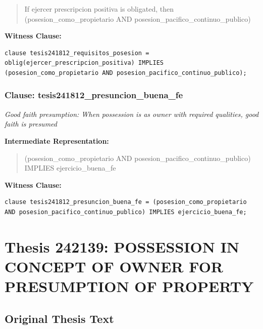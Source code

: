 \documentclass[11pt,a4paper]{article}
\begin{document}
\begin{quote}
If ejercer prescripcion positiva is obligated, then (posesion\_como\_propietario AND posesion\_pacifico\_continuo\_publico)
\end{quote}

\textbf{Witness Clause:}

\begin{lstlisting}[style=witnessstyle, language=Witness]
clause tesis241812_requisitos_posesion = oblig(ejercer_prescripcion_positiva) IMPLIES (posesion_como_propietario AND posesion_pacifico_continuo_publico);
\end{lstlisting}

\subsubsection{Clause: tesis241812\_presuncion\_buena\_fe}

\textit{Good faith presumption: When possession is as owner with required qualities, good faith is presumed}

\textbf{Intermediate Representation:}

\begin{quote}
(posesion\_como\_propietario AND posesion\_pacifico\_continuo\_publico) IMPLIES ejercicio\_buena\_fe
\end{quote}

\textbf{Witness Clause:}

\begin{lstlisting}[style=witnessstyle, language=Witness]
clause tesis241812_presuncion_buena_fe = (posesion_como_propietario AND posesion_pacifico_continuo_publico) IMPLIES ejercicio_buena_fe;
\end{lstlisting}

\newpage

\section{Thesis 242139: POSSESSION IN CONCEPT OF OWNER FOR PRESUMPTION OF PROPERTY}
\label{thesis:242139}

\subsection{Original Thesis Text}
\end{document}
